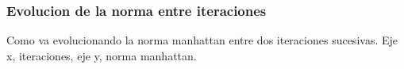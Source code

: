 \subsubsection{Evolucion de la norma entre iteraciones}
Como va evolucionando la norma manhattan entre dos iteraciones sucesivas. Eje x, iteraciones, eje y, norma manhattan.